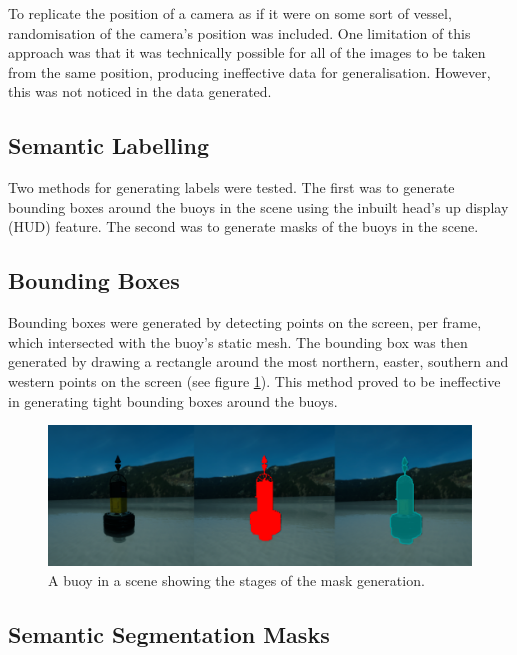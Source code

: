 \documentclass[10pt,twocolumn,letterpaper]{article}
\begin{document}
To replicate the position of a camera as if it were on some sort of vessel, randomisation of the camera's position was included. One limitation of this approach was that it was technically possible for all of the images to be taken from the same position, producing ineffective data for generalisation. However, this was not noticed in the data generated.

\subsection{Semantic Labelling}

Two methods for generating labels were tested. The first was to generate bounding boxes around the buoys in the scene using the inbuilt head's up display (HUD) feature. The second was to generate masks of the buoys in the scene. 

\subsection{Bounding Boxes}

Bounding boxes were generated by detecting points on the screen, per frame, which intersected with the buoy's static mesh. The bounding box was then generated by drawing a rectangle around the most northern, easter, southern and western points on the screen (see figure \ref{fig:buoy_with_bounding_box}). This method proved to be ineffective in generating tight bounding boxes around the buoys.

\begin{figure}[t]
    \centering
    \includegraphics[width=\linewidth]{images/masked-buoy.png}
    \caption{A buoy in a scene showing the stages of the mask generation.}
    \label{fig:buoy_with_bounding_box}
\end{figure}

\subsection{Semantic Segmentation Masks} \label {sec:semantic_segmentation_masks}
\end{document}
